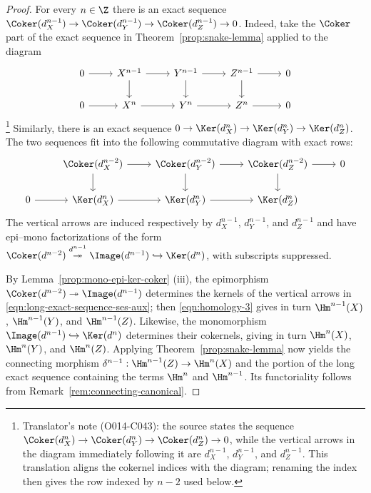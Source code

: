 \begin{proof}
	For every $n\in\Z$ there is an exact sequence
	$\Coker(d_X^{n-1})\to\Coker(d_Y^{n-1})\to\Coker(d_Z^{n-1})\to0$.
	Indeed, take the $\Coker$ part of the exact sequence in
	Theorem~\ref{prop:snake-lemma} applied to the diagram
	\[\begin{tikzcd}
		0 \arrow[r] & X^{n-1} \arrow[r] \arrow[d] & Y^{n-1} \arrow[r] \arrow[d] & Z^{n-1} \arrow[r] \arrow[d] & 0 \\
		0 \arrow[r] & X^n \arrow[r] & Y^n \arrow[r] & Z^n \arrow[r] & 0
	\end{tikzcd}\]%
	\footnote{Translator's note (O014-C043): the source states the sequence
	$\Coker(d_X^n)\to\Coker(d_Y^n)\to\Coker(d_Z^n)\to0$, while the vertical
	arrows in the diagram immediately following it are $d_X^{n-1}$,
	$d_Y^{n-1}$, and $d_Z^{n-1}$. This translation aligns the cokernel indices
	with the diagram; renaming the index then gives the row indexed by $n-2$
	used below.}
	Similarly, there is an exact sequence
	$0\to\Ker(d_X^n)\to\Ker(d_Y^n)\to\Ker(d_Z^n)$. The two sequences fit
	into the following commutative diagram with exact rows:
	\begin{equation}\label{eqn:long-exact-sequence-ses-aux}\begin{tikzcd}
		& \Coker(d_X^{n-2}) \arrow[r] \arrow[d] & \Coker(d_Y^{n-2}) \arrow[r] \arrow[d] & \Coker(d_Z^{n-2}) \arrow[d] \arrow[r] & 0 \\
		0 \arrow[r] & \Ker(d_X^n) \arrow[r] & \Ker(d_Y^n) \arrow[r] & \Ker(d_Z^n) &
	\end{tikzcd}\end{equation}
	The vertical arrows are induced respectively by $d_X^{n-1}$,
	$d_Y^{n-1}$, and $d_Z^{n-1}$ and have epi--mono factorizations of the
	form
	$\Coker(d^{n-2})\stackrel{d^{n-1}}{\twoheadrightarrow}
	\Image(d^{n-1})\hookrightarrow\Ker(d^n)$, with subscripts suppressed.

	By Lemma~\ref{prop:mono-epi-ker-coker} (iii), the epimorphism
	$\Coker(d^{n-2})\twoheadrightarrow\Image(d^{n-1})$ determines the
	kernels of the vertical arrows in
	\eqref{eqn:long-exact-sequence-ses-aux}; then
	\eqref{eqn:homology-3} gives in turn $\Hm^{n-1}(X)$, $\Hm^{n-1}(Y)$,
	and $\Hm^{n-1}(Z)$. Likewise, the monomorphism
	$\Image(d^{n-1})\hookrightarrow\Ker(d^n)$ determines their cokernels,
	giving in turn $\Hm^n(X)$, $\Hm^n(Y)$, and $\Hm^n(Z)$. Applying
	Theorem~\ref{prop:snake-lemma} now yields the connecting morphism
	$\delta^{n-1}:\Hm^{n-1}(Z)\to\Hm^n(X)$ and the portion of the long exact
	sequence containing the terms $\Hm^n$ and $\Hm^{n-1}$. Its functoriality
	follows from Remark~\ref{rem:connecting-canonical}.
\end{proof}

